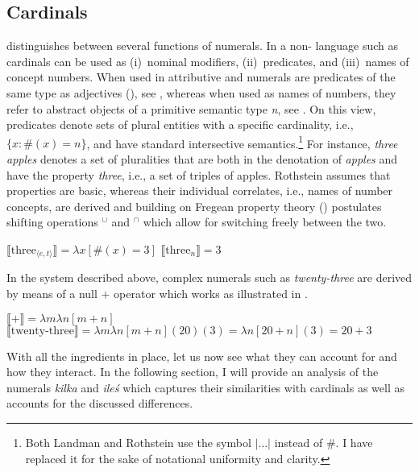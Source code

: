 \documentclass[output=paper, newtxmath, colorlinks, citecolor=brown]{langsci/langscibook}
\begin{document}
	\subsection{Cardinals}\label{sec:cardinals}

	\cite{rothstein2013fregean,rothstein2017semantics} distinguishes between several functions of numerals. In a non- language such as  cardinals can be used as (i)~nominal modifiers, (ii)~predicates, and (iii)~names of concept numbers. When used in attributive and  numerals are  predicates of the same type as adjectives (\citealt{landman2003predicate}), see , whereas when used as names of numbers, they refer to abstract objects of a primitive semantic type \textit{n}, see . On this view,  predicates denote sets of plural entities with a specific cardinality, i.e., $\{ x: \#(x) = n\}$, and have standard intersective semantics.\footnote{Both Landman and Rothstein use the symbol $|\dots|$ instead of $\#$. I have replaced it for the sake of notational uniformity and clarity.} For instance, \textit{three apples} denotes a set of pluralities that are both in the denotation of \textit{apples} and have the property \textit{three}, i.e., a set of triples of apples. Rothstein assumes that  properties are basic, whereas their individual correlates, i.e., names of number concepts, are derived and building on Fregean property theory (\citealt{chierchia1985formal}) postulates shifting operations $^\cup$ and $^\cap$ which allow for switching freely between the two.

	\ea \ea $\llbracket\text{three}_{\langle e,t\rangle}\rrbracket=\lambda x[\#(x) = 3]$\label{ex:cardinals-predicates}
	\ex $\llbracket\text{three}_n\rrbracket=3$\label{ex:cardinals-names}
	\z
    \z

\noindent In the system described above, complex numerals such as \textit{twenty-three} are derived by means of a null $+$ operator which works as illustrated in .

	\ea\label{ex:plus} \ea $\llbracket+\rrbracket=\lambda m\lambda n[m+n]$
	\ex $\llbracket\text{twenty-three}\rrbracket=\lambda m\lambda n[m+n](20)(3)=\lambda n[20+n](3)=20+3$
	\z
    \z

	\noindent With all the ingredients in place, let us now see what they can account for and how they interact. In the following section, I will provide an analysis of the   numerals \textit{kilka} and \textit{ileś} which captures their similarities with cardinals as well as accounts for the discussed differences.
\end{document}
